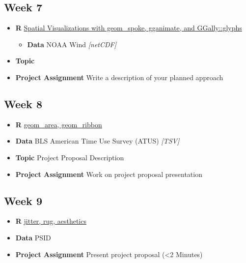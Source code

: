 \documentclass[]{book}
\providecommand{\tightlist}{%
  \setlength{\itemsep}{0pt}\setlength{\parskip}{0pt}}
\theoremstyle{definition}
\theoremstyle{definition}
\theoremstyle{remark}
\begin{document}
\subsection*{Week 7}\label{week-7}

\begin{itemize}
\tightlist
\item
  \textbf{R} \protect\hyperlink{geom_spoke}{Spatial Visualizations with
  geom\_spoke, gganimate, and GGally::glyphs}

  \begin{itemize}
  \tightlist
  \item
    \textbf{Data} NOAA Wind \emph{{[}netCDF{]}}
  \end{itemize}
\item
  \textbf{Topic}
\item
  \textbf{Project Assignment} Write a description of your planned
  approach
\end{itemize}

\subsection*{Week 8}\label{week-8}

\begin{itemize}
\tightlist
\item
  \textbf{R} \protect\hyperlink{area-and-ribbons}{geom\_area,
  geom\_ribbon}
\item
  \textbf{Data} BLS American Time Use Survey (ATUS) \emph{{[}TSV{]}}
\item
  \textbf{Topic} Project Proposal Description
\item
  \textbf{Project Assignment} Work on project proposal presentation
\end{itemize}

\subsection*{Week 9}\label{week-9}

\begin{itemize}
\tightlist
\item
  \textbf{R} \protect\hyperlink{jitter-rug}{jitter, rug, aesthetics}
\item
  \textbf{Data} PSID
\item
  \textbf{Project Assignment} Present project proposal (\textless{}2
  Minutes)
\end{itemize}
\end{document}
